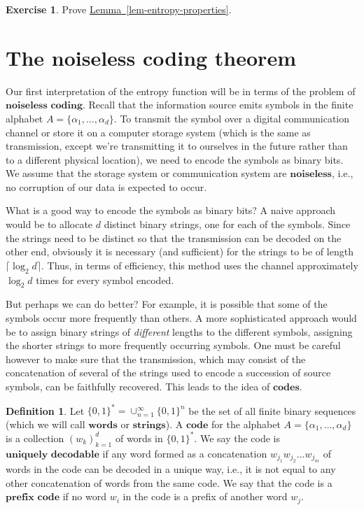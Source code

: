\documentclass[11pt]{report}
\theoremstyle{plain}
\theoremstyle{definition}
\newtheorem{defn}[thm]{Definition}
\newtheorem{xexercise}[thm]{Exercise}
\begin{document}
\begin{xexercise}
Prove \hyperref[lem-entropy-properties]{Lemma~\ref*{lem-entropy-properties}}.
\end{xexercise}

\section{The noiseless coding theorem}

Our first interpretation of the entropy function will
be in terms of the problem of
$\textbf{noiseless coding}$. Recall that the
information source emits symbols in the finite
alphabet $A=\{\alpha_1,\ldots,\alpha_d\}$. To
transmit the symbol over a digital communication
channel or store it on a computer storage system
(which is the same as transmission, except we're
transmitting it to ourselves in the future rather than
to a different physical location), we need to encode
the symbols as binary bits. We assume that the storage
system or communication system are
$\textbf{noiseless}$, i.e., no corruption of our data
is expected to occur.

What is a good way to encode the symbols as binary
bits? A naive approach would be to allocate $d$
distinct binary strings, one for each of the symbols.
Since the strings need to be distinct so that the
transmission can be decoded on the other end,
obviously it is necessary (and sufficient) for the
strings to be of length $\lceil \log_2 d\rceil$.
Thus, in terms of efficiency, this method uses the
channel approximately $\log_2 d$ times for every
symbol encoded.

But perhaps we can do better? For example, it is
possible that some of the symbols occur more
frequently than others. A more sophisticated approach
would be to assign binary strings of \emph{different}
lengths to the different symbols, assigning the
shorter strings to more frequently occurring symbols.
One must be careful however to make sure that the
transmission, which may consist of the concatenation
of several of the strings used to encode a succession
of source symbols, can be faithfully recovered. This
leads to the idea of $\textbf{codes}$.

\begin{defn}
Let $\{0,1\}^*=\cup_{n=1}^\infty \{0,1\}^n$ be the
set of all finite binary sequences (which we will call
$\textbf{words}$ or $\textbf{strings}$). A
$\textbf{code}$ for the alphabet
$A=\{ \alpha_1,\ldots,\alpha_d\}$ is a collection
$(w_k)_{k=1}^d$ of words in $\{0,1\}^*$. We say the
code is $\textbf{uniquely decodable}$ if any word
formed as a concatenation
$w_{j_1}w_{j_2}\ldots w_{j_m}$ of words in the code
can be decoded in a unique way, i.e., it is not equal
to any other concatenation of words from the same
code. We say that the code is a $\textbf{prefix code}$
if no word $w_i$ in the code is a prefix of another
word $w_j$.
\end{defn}
\end{document}
